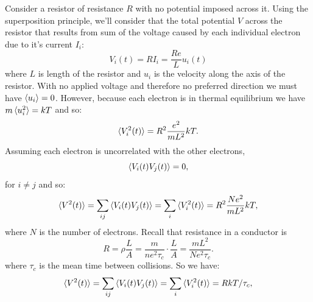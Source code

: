 \documentclass[12pt,oneside]{book}
\begin{document}
Consider a resistor of resistance $R$ with no potential imposed across it.  Using the superposition principle, we'll consider that the total potential $V$ across the resistor that results from sum of the voltage caused by each individual electron due to it's current $I_i$:
\begin{displaymath}
V_i(t) = R I_i = \frac{Re}{L} u_i(t)
\end{displaymath}
where $L$ is length of the resistor and $u_i$ is the velocity along the axis of the resistor.  With no applied voltage and therefore no preferred direction we must have $\braket{u_i}=0$.  However, because each electron is in thermal equilibrium we have $m\braket{u^2_i}=kT$ and so:
\begin{displaymath}
\braket{V^2_i(t)} = R^2 \frac{e^2}{m L^2} kT.
\end{displaymath}
Assuming each electron is uncorrelated with the other electrons,
\begin{displaymath}
\braket{V_i(t) V_j(t)} = 0,
\end{displaymath}
for $i \neq j$ and so:
\begin{displaymath}
\braket{V^2(t)} =  \sum_{ij}  \braket{ V_i(t) V_j(t) } = \sum_{i}  \braket{ V^2_i(t) } = R^2 \frac{N e^2}{m L^2} kT,
\end{displaymath}
where $N$ is the number of electrons.
Recall that resistance in a conductor is 
\begin{displaymath}
R = \rho \frac{L}{A} = \frac{m}{ne^2 \tau_c} \cdot \frac{L}{A}  = \frac{m L^2}{N e^2 \tau_c}.
\end{displaymath}
where $\tau_c$ is the mean time between collisions.  So we have:
\begin{displaymath}
\braket{V^2(t)} =  \sum_{ij}  \braket{ V_i(t) V_j(t)  } = \sum_{i}  \braket{ V^2_i(t) } = RkT / \tau_c,
\end{displaymath}
\end{document}
